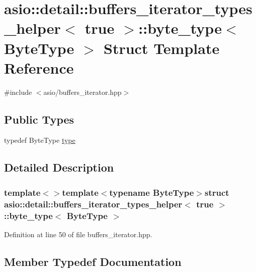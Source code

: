\hypertarget{structasio_1_1detail_1_1buffers__iterator__types__helper_3_01true_01_4_1_1byte__type}{}\section{asio\+:\+:detail\+:\+:buffers\+\_\+iterator\+\_\+types\+\_\+helper$<$ true $>$\+:\+:byte\+\_\+type$<$ Byte\+Type $>$ Struct Template Reference}
\label{structasio_1_1detail_1_1buffers__iterator__types__helper_3_01true_01_4_1_1byte__type}


{\ttfamily \#include $<$asio/buffers\+\_\+iterator.\+hpp$>$}

\subsection*{Public Types}
\begin{DoxyCompactItemize}
\item 
typedef Byte\+Type \hyperlink{structasio_1_1detail_1_1buffers__iterator__types__helper_3_01true_01_4_1_1byte__type_ae33e5b0cb09ca144f1a2262a7a31502a}{type}
\end{DoxyCompactItemize}


\subsection{Detailed Description}
\subsubsection*{template$<$$>$template$<$typename Byte\+Type$>$struct asio\+::detail\+::buffers\+\_\+iterator\+\_\+types\+\_\+helper$<$ true $>$\+::byte\+\_\+type$<$ Byte\+Type $>$}



Definition at line 50 of file buffers\+\_\+iterator.\+hpp.



\subsection{Member Typedef Documentation}
\hypertarget{structasio_1_1detail_1_1buffers__iterator__types__helper_3_01true_01_4_1_1byte__type_ae33e5b0cb09ca144f1a2262a7a31502a}{}
